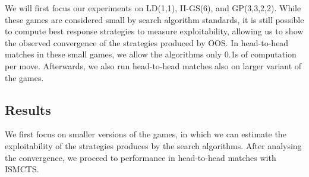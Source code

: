 \documentclass{aamas2015}
\begin{document}
We will first focus our experiments on LD(1,1), II-GS(6), and GP(3,3,2,2). While these games are considered small by search algorithm standards, it is still possible to compute best response strategies to measure exploitability, allowing us to show the observed convergence of the strategies produced by OOS. In head-to-head matches in these small games, we allow the algorithms only 0.1s of computation per move. Afterwards, we also run head-to-head matches also on larger variant of the games. 

\subsection{Results}

We first focus on smaller versions of the games, in which we can estimate the exploitability of the strategies produces by the search algorithms. After analysing the convergence, we proceed to performance in head-to-head matches with ISMCTS.
\end{document}
